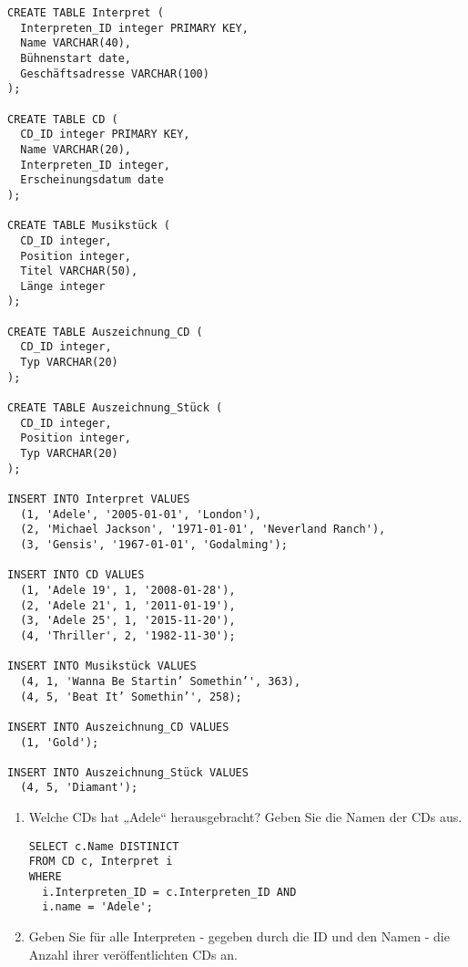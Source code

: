 \documentclass{bschlangaul-aufgabe}
\begin{document}
\begin{liAdditum}[Übungsdatenbank]
\begin{verbatim}
CREATE TABLE Interpret (
  Interpreten_ID integer PRIMARY KEY,
  Name VARCHAR(40),
  Bühnenstart date,
  Geschäftsadresse VARCHAR(100)
);

CREATE TABLE CD (
  CD_ID integer PRIMARY KEY,
  Name VARCHAR(20),
  Interpreten_ID integer,
  Erscheinungsdatum date
);

CREATE TABLE Musikstück (
  CD_ID integer,
  Position integer,
  Titel VARCHAR(50),
  Länge integer
);

CREATE TABLE Auszeichnung_CD (
  CD_ID integer,
  Typ VARCHAR(20)
);

CREATE TABLE Auszeichnung_Stück (
  CD_ID integer,
  Position integer,
  Typ VARCHAR(20)
);

INSERT INTO Interpret VALUES
  (1, 'Adele', '2005-01-01', 'London'),
  (2, 'Michael Jackson', '1971-01-01', 'Neverland Ranch'),
  (3, 'Gensis', '1967-01-01', 'Godalming');

INSERT INTO CD VALUES
  (1, 'Adele 19', 1, '2008-01-28'),
  (2, 'Adele 21', 1, '2011-01-19'),
  (3, 'Adele 25', 1, '2015-11-20'),
  (4, 'Thriller', 2, '1982-11-30');

INSERT INTO Musikstück VALUES
  (4, 1, 'Wanna Be Startin’ Somethin’', 363),
  (4, 5, 'Beat It’ Somethin’', 258);

INSERT INTO Auszeichnung_CD VALUES
  (1, 'Gold');

INSERT INTO Auszeichnung_Stück VALUES
  (4, 5, 'Diamant');
\end{verbatim}

\end{liAdditum}\begin{enumerate}


\item Welche CDs hat „Adele“ herausgebracht? Geben Sie die Namen der CDs
aus.

\begin{bAntwort}
\begin{verbatim}
SELECT c.Name DISTINICT
FROM CD c, Interpret i
WHERE
  i.Interpreten_ID = c.Interpreten_ID AND
  i.name = 'Adele';
\end{verbatim}
\end{bAntwort}


\item Geben Sie für alle Interpreten - gegeben durch die ID und den
Namen - die Anzahl ihrer veröffentlichten CDs an.


\end{enumerate}
\end{document}
